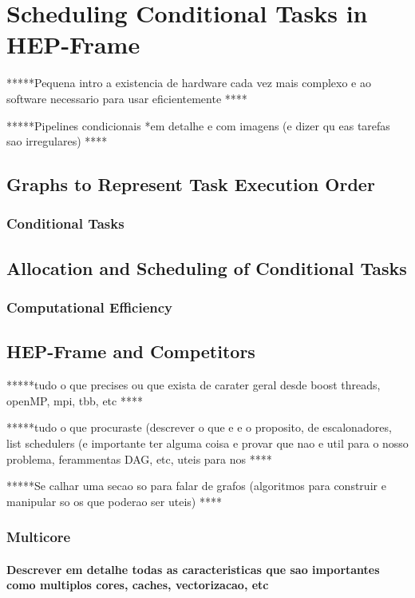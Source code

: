 \chapter{Scheduling Conditional Tasks in HEP-Frame}

 *****Pequena intro a existencia de hardware cada vez mais complexo e ao software necessario para usar eficientemente ****

 *****Pipelines condicionais *em detalhe e com imagens (e dizer qu eas tarefas sao irregulares) ****


\section{Graphs to Represent Task Execution Order}

\subsection{Conditional Tasks}

\section{Allocation and Scheduling of Conditional Tasks}

\subsection{Computational Efficiency}


\section{HEP-Frame and Competitors}




 *****tudo o que precises ou que exista de carater geral desde boost threads, openMP, mpi, tbb, etc ****
 
 *****tudo o que procuraste (descrever o que e e o proposito, de escalonadores, list schedulers (e importante ter alguma coisa e provar que nao e util para o nosso problema, ferammentas DAG, etc, uteis para nos  ****
 
 *****Se calhar uma secao so para falar de grafos (algoritmos para construir e manipular so os que poderao ser uteis) ****

\subsection{Multicore}
\subsubsection{Descrever em detalhe todas as caracteristicas que sao importantes como multiplos cores, caches, vectorizacao, etc}
